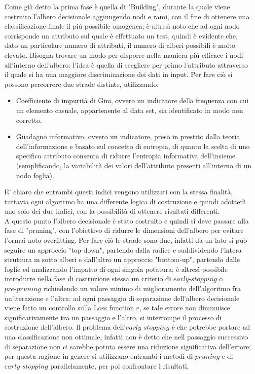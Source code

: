 Come già detto la prima fase è quella di "Building", durante la quale viene costruito l'albero decisionale aggiungendo nodi e rami, con il fine di ottenere una classificazione finale il più possibile omogenea; è altresì noto che ad ogni nodo corrisponde un attributo sul quale è effettuato un test, quindi è evidente che, dato un particolare numero di attributi, il numero di alberi possibili è molto elevato. Bisogna trovare un modo per disporre nella maniera più efficace i nodi all'interno dell'albero: l'idea è quella di scegliere per primo l'attributo attraverso il quale si ha una maggiore discriminazione dei dati in input. Per fare ciò si possono percorrere due strade distinte, utilizzando:
\begin{itemize}
	\item Coefficiente di impurità di Gini, ovvero un indicatore della frequenza con cui un elemento casuale, appartenente al data set, sia identificato in modo non corretto.
	\item Guadagno informativo, ovvero un indicatore, preso in prestito dalla teoria dell'informazione e basato sul concetto di entropia, di quanto la scelta di uno specifico attributo consenta di ridurre l’entropia informativa dell'insieme (semplificando, la variabilità dei valori dell'attributo presenti all'interno di un nodo foglia). 
\end{itemize} 
E' chiaro che entrambi questi indici vengono utilizzati con la stessa finalità, tuttavia ogni algoritmo ha una differente logica di costruzione e quindi adotterà uno solo dei due indici, con la possibilità di ottenere risultati differenti. \\
A questo punto l'albero decisionale è stato costruito e quindi si deve passare alla fase di "pruning", con l'obiettivo di ridurre le dimensioni dell'albero per evitare l'ormai noto overfitting. Per fare ciò le strade sono due, infatti da un lato si può seguire un approccio "top-down", partendo dalla radice e suddividendo l'intera struttura in sotto alberi e dall'altro un approccio "bottom-up", partendo dalle foglie ed analizzando l'impatto di ogni singola potatura; è altresì possibile introdurre nella fase di costruzione stessa un criterio di $\textit{early-stopping}$ o $\textit{pre-pruning}$ richiedendo un valore minimo di miglioramento dell'algoritmo fra un'iterazione e l'altra: ad ogni passaggio di separazione dell'albero decisionale viene fatto un controllo sulla Loss function e, se tale errore non diminuisce significativamente tra un passaggio e l'altro, si interrompe il processo di costruzione dell'albero. Il problema dell'$\textit{early stopping}$ è che potrebbe portare ad una classificazione non ottimale, infatti non è detto che nell passaggio successivo di separazione non ci sarebbe potuta essere una riduzione significativa dell'errore; per questa ragione in genere si utilizzano entrambi i metodi di $\textit{pruning}$ e di $\textit{early stopping}$ parallelamente, per poi confrontare i risultati. \\

